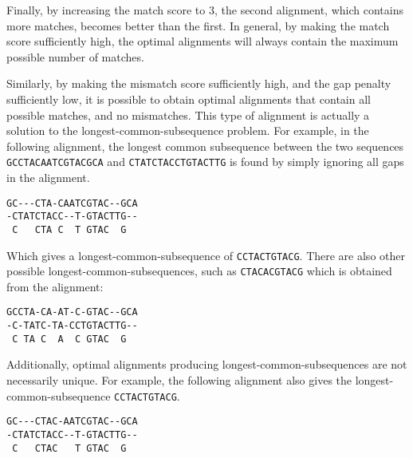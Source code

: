 \documentclass[a4paper]{report}
\begin{document}
Finally, by increasing the match score to 3, the second alignment, which contains more matches, becomes better
than the first. In general, by making the match score sufficiently high, the optimal alignments will always
contain the maximum possible number of matches.

Similarly, by making the mismatch score sufficiently high, and the gap penalty sufficiently low,
it is possible to obtain optimal alignments that contain all possible matches, and no mismatches.
This type of alignment is actually a solution to the longest-common-subsequence problem. For example,
in the following alignment, the longest common subsequence between the two sequences \verb=GCCTACAATCGTACGCA=
and \verb=CTATCTACCTGTACTTG= is found by simply ignoring all gaps in the alignment.

\begin{verbatim}
GC---CTA-CAATCGTAC--GCA
-CTATCTACC--T-GTACTTG--
 C   CTA C  T GTAC  G
\end{verbatim}

Which gives a longest-common-subsequence of \verb=CCTACTGTACG=. There are also other
possible longest-common-subsequences, such as \verb=CTACACGTACG= which is obtained
from the alignment:

\begin{verbatim}
GCCTA-CA-AT-C-GTAC--GCA
-C-TATC-TA-CCTGTACTTG--
 C TA C  A  C GTAC  G
\end{verbatim}

Additionally, optimal alignments producing longest-common-subsequences are not necessarily unique.
For example, the following alignment also gives the longest-common-subsequence \verb=CCTACTGTACG=.

\begin{verbatim}
GC---CTAC-AATCGTAC--GCA
-CTATCTACC--T-GTACTTG--
 C   CTAC   T GTAC  G
 \end{verbatim}
\end{document}
